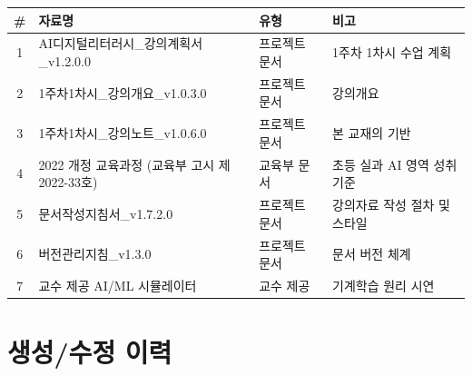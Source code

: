 \documentclass[11pt,a4paper]{article}
\renewcommand{\arraystretch}{1.4}
\begin{document}
\begin{center}
\renewcommand{\arraystretch}{1.4}
\begin{tabular}{|c|p{6.5cm}|p{3cm}|p{3cm}|}
\hline
\rowcolor{tableheader}
\textbf{\#} & \textbf{자료명} & \textbf{유형} & \textbf{비고} \\
\hline
1 & AI디지털리터러시\_강의계획서\_v1.2.0.0 & 프로젝트 문서 & 1주차 1차시 수업 계획 \\
\hline
2 & 1주차1차시\_강의개요\_v1.0.3.0 & 프로젝트 문서 & 강의개요 \\
\hline
3 & 1주차1차시\_강의노트\_v1.0.6.0 & 프로젝트 문서 & 본 교재의 기반 \\
\hline
4 & 2022 개정 교육과정 (교육부 고시 제2022-33호) & 교육부 문서 & 초등 실과 AI 영역 성취기준 \\
\hline
5 & 문서작성지침서\_v1.7.2.0 & 프로젝트 문서 & 강의자료 작성 절차 및 스타일 \\
\hline
6 & 버전관리지침\_v1.3.0 & 프로젝트 문서 & 문서 버전 체계 \\
\hline
7 & 교수 제공 AI/ML 시뮬레이터 & 교수 제공 & 기계학습 원리 시연 \\
\hline
\end{tabular}
\end{center}

\section*{생성/수정 이력}
\end{document}
